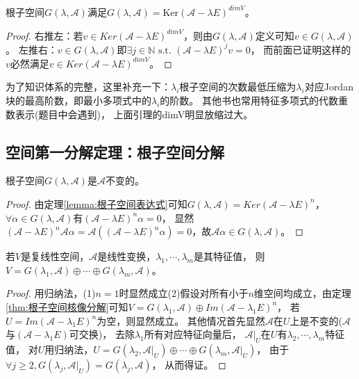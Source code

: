 \begin{theorem}[根子空间的具体表达] \label{lemma:根子空间表达式}
  根子空间$G(\lambda, \mathcal{A})$满足$G(\lambda, \mathcal{A}) = \text{Ker}( \mathcal{A} - \lambda E)^{dim V}$。
\end{theorem}

\begin{proof}
  右推左：若$v \in Ker( \mathcal{A} - \lambda E)^{dim V}$，则由$G(\lambda, \mathcal{A})$定义可知$v \in G(\lambda, \mathcal{A})$。
  左推右：$v \in G(\lambda, \mathcal{A})$即$\exists j \in \mathbb{N} \text{ s.t. }(\mathcal{A} - \lambda E)^j v = 0$，
  而前面已证明这样的$v$必然满足$v \in Ker( \mathcal{A} - \lambda E)^{dim V}$。
\end{proof}

\begin{note}
  为了知识体系的完整，这里补充一下：$\lambda_i$根子空间的次数最低压缩为$\lambda_i$对应Jordan块的最高阶数，即最小多项式中的$\lambda_i$的阶数。
  其他书也常用特征多项式的代数重数表示(题目中会遇到)，
  上面引理的dimV明显放缩过大。
\end{note}

\subsection{空间第一分解定理：根子空间分解}

\begin{theorem}[根子空间的不变性]
  根子空间$G(\lambda, \mathcal{A})$是$\mathcal{A}$不变的。
\end{theorem}

\begin{proof}
  由定理\ref{lemma:根子空间表达式}可知$G(\lambda, \mathcal{A}) = Ker( \mathcal{A} - \lambda E)^n$，
  $\forall \alpha \in G(\lambda, \mathcal{A})$有$( \mathcal{A} - \lambda E)^n \alpha = 0$，
  显然$( \mathcal{A} - \lambda E)^n \mathcal{A} \alpha = \mathcal{A}( ( \mathcal{A} - \lambda E)^n \alpha) = 0$，故$\mathcal{A} \alpha \in G(\lambda, \mathcal{A})$。
\end{proof}

\begin{theorem}
  若$V$是复线性空间，$\mathcal{A}$是线性变换，$\lambda_1,\cdots,\lambda_m$是其特征值，
  则$V = G(\lambda_1, \mathcal{A}) \oplus \cdots \oplus G(\lambda_m, \mathcal{A})$。
\end{theorem}

\begin{proof}
  用归纳法，(1)$n = 1$时显然成立(2)假设对所有小于$n$维空间均成立，由定理\ref{thm:根子空间核像分解}可知$V = G(\lambda_1, \mathcal{A}) \oplus Im ( \mathcal{A} - \lambda_1 E)^n$，
  若$U = Im ( \mathcal{A} - \lambda_1 E)^n$为空，则显然成立。
  其他情况首先显然$\mathcal{A}$在$U$上是不变的($\mathcal{A}$与$( \mathcal{A} - \lambda_1 E)$可交换)，
  去除$\lambda_1$所有对应特征向量后，
  $\mathcal{A}|_U$在$U$有$\lambda_2,\cdots,\lambda_m$特征值，
  对$U$用归纳法，$U = G(\lambda_2, \mathcal{A}|_U) \oplus \cdots \oplus G(\lambda_m, \mathcal{A}|_U)$，
  由于$\forall j \geq 2, G(\lambda_j, \mathcal{A}|_U) = G(\lambda_j, \mathcal{A})$，
  从而得证。
\end{proof}

